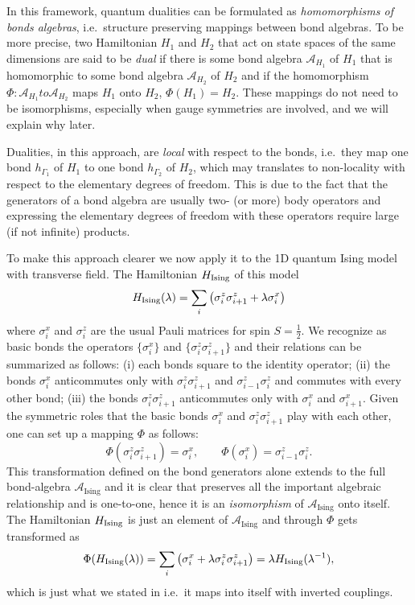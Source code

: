 In this framework, quantum dualities can be formulated as \emph{homomorphisms of bonds algebras}, i.e.~structure preserving mappings between bond algebras.
To be more precise, two Hamiltonian $H_1$ and $H_2$ that act on state spaces of the same dimensions are said to be \emph{dual} if there is some bond algebra $\mathcal{A}_{H_1}$ of $H_1$ that is homomorphic to some bond algebra $\mathcal{A}_{H_2}$ of $H_2$ and if the homomorphism $\Phi : \mathcal{A}_{H_1} to \mathcal{A}_{H_2}$ maps $H_1$ onto $H_2$, $\Phi(H_1) = H_2$.
These mappings do not need to be isomorphisms, especially when gauge symmetries are involved, and we will explain why later.

Dualities, in this approach, are \emph{local} with respect to the bonds, i.e.~they map one bond $h_{\Gamma_1}$ of $H_1$ to one bond $h_{\Gamma_2}$ of $H_2$, which may translates to non-locality with respect to the elementary degrees of freedom.
This is due to the fact that the generators of a bond algebra are usually two- (or more) body operators and expressing the elementary degrees of freedom with these operators require large (if not infinite) products.

To make this approach clearer we now apply it to the 1D quantum Ising model with transverse field.
The Hamiltonian $H_{\text{Ising}}$ of this model
\begin{equation}
    \HIsing(\lambda) = \sum_{i}  \pqty{ \sigma_i^z \sigma_{i+1}^z + \lambda \sigma_i^x }
\end{equation}
where $\sigma^x_i$ and $\sigma^z_i$ are the usual Pauli matrices for spin $S= \frac{1}{2} $.
We recognize as basic bonds the operators $\{\sigma^x_i\}$ and $\{\sigma^z_i \sigma^z_{i+1}\}$ and their relations can be summarized as follows: (i) each bonds square to the identity operator; (ii) the bonds $\sigma_i^x$ anticommutes only with $\sigma^z_i \sigma^z_{i+1}$ and $\sigma^z_{i-1} \sigma^z_i$ and commutes with every other bond; (iii) the bonds $\sigma^z_i \sigma^z_{i+1}$ anticommutes only with $\sigma^x_i$ and $\sigma^x_{i+1}$.
Given the symmetric roles that the basic bonds $\sigma^x_i$ and $\sigma^z_i \sigma^z_{i+1}$ play with each other, one can set up a mapping $\Phi$ as follows:
\begin{equation}
    \Phi(\sigma^z_i \sigma^z_{i+1}) = \sigma^x_i, \qquad
    \Phi(\sigma^x_i) = \sigma^z_{i-1} \sigma^z_i.
    \label{eq:duality_ising}
\end{equation}
This transformation defined on the bond generators alone extends to the full bond-algebra $\mathcal{A}_{\text{Ising}}$ and it is clear that preserves all the important algebraic relationship and is one-to-one, hence it is an \emph{isomorphism} of $\mathcal{A}_{\text{Ising}}$ onto itself.
The Hamiltonian $H_{\text{Ising}}$ is just an element of $\mathcal{A}_{\text{Ising}}$ and through $\Phi$ gets transformed as
\begin{equation}
    \Phi( \HIsing(\lambda) )
    = \sum_{i} \pqty{ \sigma_i^x + \lambda \sigma^z_{i} \sigma^z_{i+1}} \\
    = \lambda \HIsing(\lambda^{-1}),
\end{equation}
which is just what we stated in 
i.e.~it maps into itself with inverted couplings.

